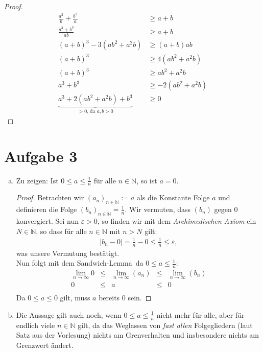 \documentclass{scrreprt}
\newcommand{\NN}{\mathbb{N}}
\begin{document}
\begin{enumerate}[(a)]
\begin{align*}
				\end{align*}
				\begin{proof}
					\begin{align*}
						\frac{a^2}{b} + \frac{b^2}{a} &\geq a + b\\
						\frac{a^3 + b^3}{ab} &\geq a+b\\
						(a+b)^3 - 3(a b^2 + a^2 b) &\geq (a+b) ab\\
						(a+b)^3 & \geq 4(a b^2 + a^2 b)\\
						(a+b)^3 & \geq a b^2 + a^2 b\\
						a^3 + b^3 & \geq -2(a b^2 + a^2 b)\\
						\underbrace{a^3 + 2(a b^2 + a^2 b) + b^3}_\text{$> 0$, da $a, b > 0$} &\geq 0
					\end{align*}
				\end{proof}
		\end{enumerate}

	\section*{Aufgabe 3}
		\begin{enumerate}[(a)]
			\item
				Zu zeigen: Ist $0 \leq a \leq \frac{1}{n}$ für alle $n \in \NN$, so ist $a = 0$.\\
			\begin{proof}
				Betrachten wir $(a_n)_{n \in \NN} := a$ als die Konstante Folge $a$ und definieren die Folge $(b_n)_{n \in \NN} = \frac{1}{n}$. Wir vermuten, dass $(b_n)$ gegen 0 konvergiert. Sei nun $\varepsilon > 0$, so finden wir mit dem \emph{Archimedischen Axiom} ein $N \in \NN$, so dass für alle $n \in \NN$ mit $n > N$ gilt: 
				\begin{align*}
					|b_n - 0| = \frac{1}{n} - 0 \leq \frac{1}{n} \leq \varepsilon,
				\end{align*}
				was unsere Vermutung bestätigt.\\Nun folgt mit dem \glqq Sandwich-Lemma\grqq\ da $0 \leq a \leq \frac{1}{n}$:
				\begin{align*}
						\lim\limits_{n \to \infty} 0  &\leq&  \lim\limits_{n \to \infty} (a_n) & \leq&  \lim\limits_{n \to \infty}  (b_n) \\
						0  &\leq&  a  &\leq&  0\\
				\end{align*}
				Da $0 \leq a \leq 0$ gilt, muss $a$ bereits 0 sein.
			\end{proof}		
			\item
				Die Aussage gilt auch noch, wenn $0 \leq a \leq \frac{1}{n}$ nicht mehr für alle, aber für endlich viele $n \in \NN$ gilt, da das Weglassen von \emph{fast allen} Folgegliedern (laut Satz aus der Vorlesung) nichts am Grenverhalten und insbesondere nichts am Grenzwert ändert.
		\end{enumerate}
\end{document}
